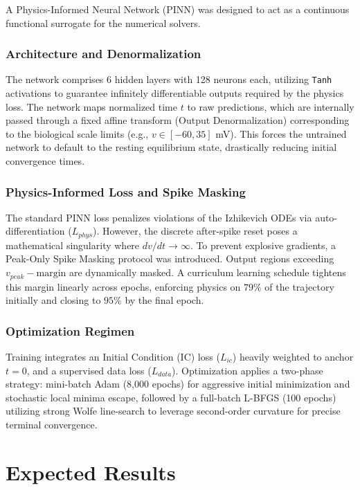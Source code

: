 \documentclass[conference]{IEEEtran}
\begin{document}
A Physics-Informed Neural Network (PINN) was designed to act as a continuous functional surrogate for the numerical solvers.

\subsubsection{Architecture and Denormalization}
The network comprises 6 hidden layers with 128 neurons each, utilizing \texttt{Tanh} activations to guarantee infinitely differentiable outputs required by the physics loss. The network maps normalized time $t$ to raw predictions, which are internally passed through a fixed affine transform (Output Denormalization) corresponding to the biological scale limits (e.g., $v \in [-60, 35]$ mV). This forces the untrained network to default to the resting equilibrium state, drastically reducing initial convergence times.

\subsubsection{Physics-Informed Loss and Spike Masking}
The standard PINN loss penalizes violations of the Izhikevich ODEs via auto-differentiation ($L_{phys}$). However, the discrete after-spike reset poses a mathematical singularity where $dv/dt \to \infty$. To prevent explosive gradients, a Peak-Only Spike Masking protocol was introduced. Output regions exceeding $v_{peak} - \text{margin}$ are dynamically masked. A curriculum learning schedule tightens this margin linearly across epochs, enforcing physics on $79\%$ of the trajectory initially and closing to $95\%$ by the final epoch.

\subsubsection{Optimization Regimen}
Training integrates an Initial Condition (IC) loss ($L_{ic}$) heavily weighted to anchor $t=0$, and a supervised data loss ($L_{data}$). Optimization applies a two-phase strategy: mini-batch Adam (8,000 epochs) for aggressive initial minimization and stochastic local minima escape, followed by a full-batch L-BFGS (100 epochs) utilizing strong Wolfe line-search to leverage second-order curvature for precise terminal convergence.

\section{Expected Results}
\end{document}
